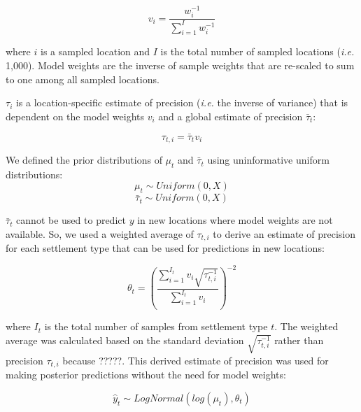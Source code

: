 \documentclass[9pt,twocolumn,twoside,lineno]{pnas-new}
\begin{document}
{	\[ v_i = \frac{ w_i^{-1} } { \sum_{i=1}^{I} w_i^{-1} }  \]
	
	\noindent where $i$ is a sampled location and $I$ is the total number of sampled locations (\textit{i.e.} 1,000).  Model weights are the inverse of sample weights that are re-scaled to sum to one among all sampled locations.
	
	$\tau_i$ is a location-specific estimate of precision (\textit{i.e.} the inverse of variance) that is dependent on the model weights $v_i$ and a global estimate of precision $\bar{\tau}_t$:
	
	\[ \tau_{t,i} = \bar{\tau}_t v_i \]
	
	
	
	
	We defined the prior distributions of $\mu_t$ and $\bar{\tau}_t$ using uninformative uniform distributions:
	 \[ \mu_t \sim Uniform(0, X) \]
	 \[ \bar{\tau}_t \sim Uniform(0, X) \]
	
	$\bar{\tau}_t$ cannot be used to predict $y$ in new locations where model weights are not available.  So, we used a weighted average of $\tau_{t,i}$ to derive an estimate of precision for each settlement type that can be used for predictions in new locations:
	
	\[ \theta_t = (\frac{\sum_{i=1}^{I_t} v_i \sqrt{\tau_{t,i}^{-1}} }{\sum_{i=1}^{I_t} v_i})^{-2}   \]
	
	\noindent where $I_t$ is the total number of samples from settlement type $t$. The weighted average was calculated based on the standard deviation $\sqrt{\tau_{t,i}^{-1}}$ rather than precision $\tau_{t,i}$ because ?????. This derived estimate of precision was used for making posterior predictions without the need for model weights:
	
	\[ \hat{y}_t \sim LogNormal( log( \mu_t ), \theta_t) \]


	
}

\showmatmethods{}


\showacknow{}


\end{document}
